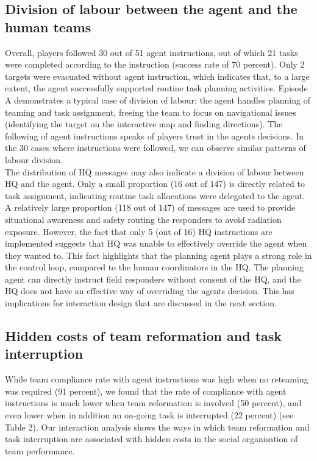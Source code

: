\subsection{Division of labour between the agent and the human teams}
Overall, players followed 30 out of 51 agent instructions, out of which 21 tasks were completed according to the instruction (success rate of 70 percent). Only 2 targets were evacuated without agent instruction, which indicates that, to a large extent, the agent successfully supported routine task planning activities. Episode A demonstrates a typical case of division of labour: the agent handles planning of teaming and task assignment, freeing the team to focus on navigational issues (identifying the target on the interactive map and finding directions). The following of agent instructions speaks of players trust in the agents decisions. In the 30 cases where instructions were followed, we can observe similar patterns of labour division.\\


The distribution of HQ messages may also indicate a division of labour between HQ and the agent. Only a small proportion (16 out of 147) is directly related to task assignment, indicating routine task allocations were delegated to the agent. A relatively large proportion (118 out of 147) of messages are used to provide situational awareness and safety routing the responders to avoid radiation exposure. However, the fact that only 5 (out of 16) HQ instructions are implemented suggests that HQ was unable to effectively override the agent when they wanted to. This fact highlights that the planning agent plays a strong role in the control loop, compared to the human coordinators in the HQ. The planning agent can directly instruct field responders without consent of the HQ, and the HQ does not have an effective way of overriding the agents decision. This has implications for interaction design that are discussed in the next section. 

\subsection{Hidden costs of team reformation and task interruption}
While team compliance rate with agent instructions was high when no reteaming was required (91 percent), we found that the rate of compliance with agent instructions is much lower when team reformation is involved (50 percent), and even lower when in addition an on-going task is interrupted (22 percent) (see Table 2). Our interaction analysis shows the ways in which team reformation and task interruption are associated with hidden costs in the social organisation of team performance.  \\

